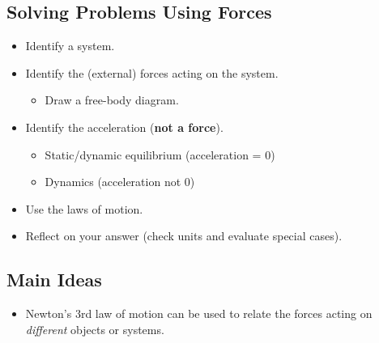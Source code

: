 \documentclass[]{article}
\begin{document}
\begin{PresentSpace}
\vspace{-10pt}
\section*{Solving Problems Using Forces}
\vspace{-10pt}
\begin{itemize}
	\item Identify a system.
	\item Identify the (external) forces acting on the system.
	\begin{itemize}
		\item Draw a free-body diagram.
	\end{itemize}
	\item Identify the acceleration (\textbf{not a force}).
	\begin{itemize}
		\item Static/dynamic equilibrium (acceleration = 0)
		\item Dynamics (acceleration not 0)
	\end{itemize}
	\item Use the laws of motion.
	\item Reflect on your answer (check units and evaluate special cases).
\end{itemize}
\end{PresentSpace}
\newpage
\begin{TeacherMargin}
	
\end{TeacherMargin}
\begin{PresentSpace}
\section*{Main Ideas}
\begin{itemize}
	\item Newton's 3rd law of motion can be used to relate the forces acting on \textit{different} objects or systems.
\end{itemize}
\end{PresentSpace}
\end{document}
